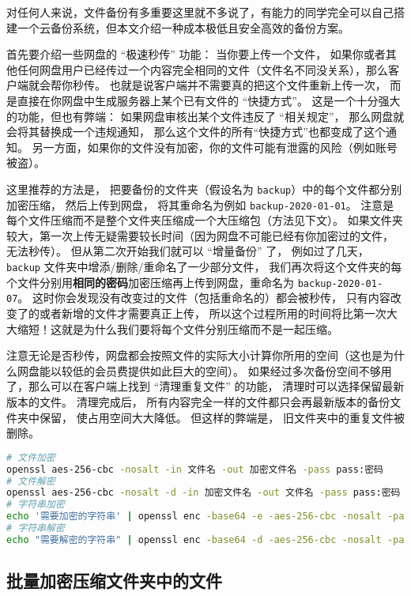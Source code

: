 
对任何人来说，文件备份有多重要这里就不多说了，有能力的同学完全可以自己搭建一个云备份系统，但本文介绍一种成本极低且安全高效的备份方案。

首先要介绍一些网盘的 “极速秒传” 功能： 当你要上传一个文件， 如果你或者其他任何网盘用户已经传过一个内容完全相同的文件（文件名不同没关系），那么客户端就会帮你秒传。 也就是说客户端并不需要真的把这个文件重新上传一次， 而是直接在你网盘中生成服务器上某个已有文件的 “快捷方式”。 这是一个十分强大的功能，但也有弊端： 如果网盘审核出某个文件违反了 “相关规定”， 那么网盘就会将其替换成一个违规通知， 那么这个文件的所有“快捷方式”也都变成了这个通知。 另一方面，如果你的文件没有加密，你的文件可能有泄露的风险（例如账号被盗）。

这里推荐的方法是， 把要备份的文件夹（假设名为 \verb|backup|）中的每个文件都分别加密压缩， 然后上传到网盘， 将其重命名为例如 \verb|backup-2020-01-01|。 注意是每个文件压缩而不是整个文件夹压缩成一个大压缩包（方法见下文）。 如果文件夹较大，第一次上传无疑需要较长时间（因为网盘不可能已经有你加密过的文件， 无法秒传）。 但从第二次开始我们就可以 “增量备份” 了， 例如过了几天， \verb|backup| 文件夹中增添/删除/重命名了一少部分文件， 我们再次将这个文件夹的每个文件分别用\textbf{相同的密码}加密压缩再上传到网盘，重命名为 \verb|backup-2020-01-07|。 这时你会发现没有改变过的文件（包括重命名的）都会被秒传， 只有内容改变了的或者新增的文件才需要真正上传， 所以这个过程所用的时间将比第一次大大缩短！这就是为什么我们要将每个文件分别压缩而不是一起压缩。

注意无论是否秒传，网盘都会按照文件的实际大小计算你所用的空间（这也是为什么网盘能以较低的会员费提供如此巨大的空间）。 如果经过多次备份空间不够用了，那么可以在客户端上找到 “清理重复文件” 的功能， 清理时可以选择保留最新版本的文件。 清理完成后， 所有内容完全一样的文件都只会再最新版本的备份文件夹中保留， 使占用空间大大降低。 但这样的弊端是， 旧文件夹中的重复文件被删除。

\begin{lstlisting}[language=bash]
# 文件加密
openssl aes-256-cbc -nosalt -in 文件名 -out 加密文件名 -pass pass:密码
# 文件解密
openssl aes-256-cbc -nosalt -d -in 加密文件名 -out 文件名 -pass pass:密码
# 字符串加密
echo '需要加密的字符串' | openssl enc -base64 -e -aes-256-cbc -nosalt -pass pass:密码
# 字符串解密
echo "需要解密的字符串" | openssl enc -base64 -d -aes-256-cbc -nosalt -pass pass:密码
\end{lstlisting}

\subsection{批量加密压缩文件夹中的文件}

